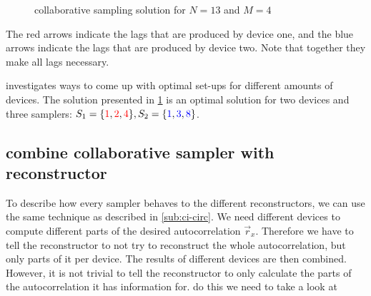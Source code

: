 \documentclass[a4paper, openany, oneside]{memoir}
\begin{document}
\begin{figure}[H]
\caption{collaborative sampling solution for $N=13$ and $M=4$}\label{tkz:collaborative_ruler}
\end{figure}

The red arrows indicate the lags that are produced by device one, and the blue arrows indicate the lags that are produced by device two. Note that together they make all lags necessary.

\cite{ariananda2014cooperative} investigates ways to come up with optimal set-ups for different amounts of devices. The solution presented in \cref{tkz:collaborative_ruler} is an optimal solution for two devices and three samplers: $S_1=\{\color{red}1\color{black},\color{red}2\color{black},\color{red}4\color{black}\}, S_2 = \{\color{blue}1\color{black},\color{blue}3\color{black},\color{blue}8\color{black}\}$.

\subsection{combine collaborative sampler with reconstructor}\label{sub:ci-collab}
To describe how every sampler behaves to the different reconstructors, we can use the same technique as described in \cref{sub:ci-circ}. We need different devices to compute different parts of the desired autocorrelation $\vec{r}_x$. Therefore we have to tell the reconstructor to not try to reconstruct the whole autocorrelation, but only parts of it per device. The results of different devices are then combined. However, it is not trivial to tell the reconstructor to only calculate the parts of the autocorrelation it has information for. do this we need to take a look at
\end{document}
